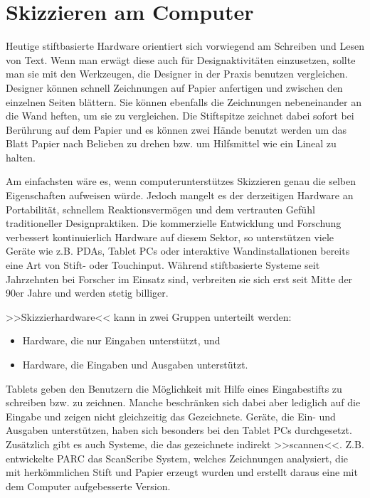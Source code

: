 \medskip 

\section{Skizzieren am Computer}

Heutige stiftbasierte Hardware orientiert sich vorwiegend am Schreiben und Lesen von Text. Wenn man erwägt diese auch für Designaktivitäten einzusetzen, sollte man sie mit den Werkzeugen, die Designer in der Praxis benutzen vergleichen. \\ Designer können schnell Zeichnungen auf Papier anfertigen und zwischen den einzelnen Seiten blättern. Sie können ebenfalls die Zeichnungen nebeneinander an die Wand heften, um sie zu vergleichen. Die Stiftspitze zeichnet dabei sofort bei Berührung auf dem Papier und es können zwei Hände benutzt werden um das Blatt Papier nach Belieben zu drehen bzw. um Hilfsmittel wie ein Lineal zu halten.

\medskip Am einfachsten wäre es, wenn computerunterstützes Skizzieren genau die selben Eigenschaften aufweisen würde. Jedoch mangelt es der derzeitigen Hardware an Portabilität, schnellem Reaktionsvermögen und dem vertrauten Gefühl traditioneller Designpraktiken. Die kommerzielle Entwicklung und Forschung verbessert kontinuierlich Hardware auf diesem Sektor, so unterstützen viele Geräte wie z.B. PDAs, Tablet PCs oder interaktive Wandinstallationen bereits eine Art von Stift- oder Touchinput. Während stiftbasierte Systeme seit Jahrzehnten bei Forscher im Einsatz sind, verbreiten sie sich erst seit Mitte der 90er Jahre und werden stetig billiger.

\medskip >>Skizzierhardware<< kann in zwei Gruppen unterteilt werden: 
\begin{itemize}
	\item{Hardware, die nur Eingaben unterstützt, und}
	\item{Hardware, die Eingaben und Ausgaben unterstützt.}
\end{itemize}

Tablets geben den Benutzern die Möglichkeit mit Hilfe eines Eingabestifts zu schreiben bzw. zu zeichnen. Manche beschränken sich dabei aber lediglich auf die Eingabe und zeigen nicht gleichzeitig das Gezeichnete. Geräte, die Ein- und Ausgaben unterstützen, haben sich besonders bei den Tablet PCs durchgesetzt. Zusätzlich gibt es auch Systeme, die das gezeichnete indirekt >>scannen<<. Z.B. entwickelte PARC das ScanScribe System, welches Zeichnungen analysiert, die mit herkömmlichen Stift und Papier erzeugt wurden und erstellt daraus eine mit dem Computer aufgebesserte Version. \citep{Johnson:2009}


